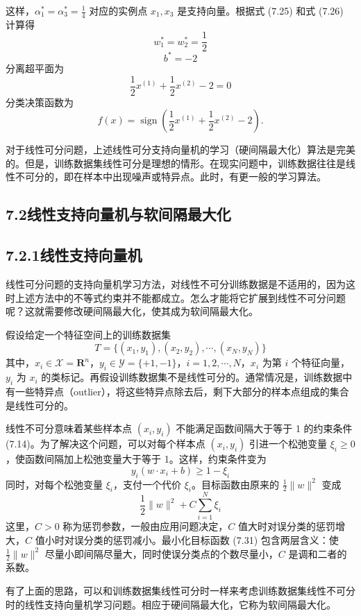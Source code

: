 \documentclass[UTF8,12pt,a4paper,fontset=fandol]{ctexart}
\begin{document}
这样，$\alpha_1^*=\alpha_3^*=\frac{1}{4}$ 对应的实例点 $x_1,x_3$ 是支持向量。根据式 (7.25) 和式 (7.26) 计算得
\[
w_1^*=w_2^*=\frac{1}{2}
\]
\[
b^*=-2
\]
分离超平面为
\[
\frac{1}{2}x^{(1)}+\frac{1}{2}x^{(2)}-2=0
\]
分类决策函数为
\[
f(x)=\operatorname{sign}\left(\frac{1}{2}x^{(1)}+\frac{1}{2}x^{(2)}-2\right).
\]

对于线性可分问题，上述线性可分支持向量机的学习（硬间隔最大化）算法是完美的。但是，训练数据集线性可分是理想的情形。在现实问题中，训练数据往往是线性不可分的，即在样本中出现噪声或特异点。此时，有更一般的学习算法。

\subsection*{7.2\quad 线性支持向量机与软间隔最大化}

\subsection*{7.2.1\quad 线性支持向量机}

线性可分问题的支持向量机学习方法，对线性不可分训练数据是不适用的，因为这时上述方法中的不等式约束并不能都成立。怎么才能将它扩展到线性不可分问题呢？这就需要修改硬间隔最大化，使其成为软间隔最大化。

假设给定一个特征空间上的训练数据集
\[
T=\{(x_1,y_1),(x_2,y_2),\cdots,(x_N,y_N)\}
\]
其中，$x_i\in\mathcal{X}=\mathbf{R}^n$，$y_i\in\mathcal{Y}=\{+1,-1\}$，$i=1,2,\cdots,N$，$x_i$ 为第 $i$ 个特征向量，$y_i$ 为 $x_i$ 的类标记。再假设训练数据集不是线性可分的。通常情况是，训练数据中有一些特异点（outlier），将这些特异点除去后，剩下大部分的样本点组成的集合是线性可分的。

线性不可分意味着某些样本点 $(x_i,y_i)$ 不能满足函数间隔大于等于 1 的约束条件 (7.14)。为了解决这个问题，可以对每个样本点 $(x_i,y_i)$ 引进一个松弛变量 $\xi_i\geq 0$，使函数间隔加上松弛变量大于等于 1。这样，约束条件变为
\[
y_i(w\cdot x_i+b)\geq 1-\xi_i
\]
同时，对每个松弛变量 $\xi_i$，支付一个代价 $\xi_i$。目标函数由原来的 $\frac{1}{2}\|w\|^2$ 变成
\begin{equation}
\frac{1}{2}\|w\|^2+C\sum_{i=1}^N\xi_i
\tag{7.31}
\end{equation}
这里，$C>0$ 称为惩罚参数，一般由应用问题决定，$C$ 值大时对误分类的惩罚增大，$C$ 值小时对误分类的惩罚减小。最小化目标函数 (7.31) 包含两层含义：使 $\frac{1}{2}\|w\|^2$ 尽量小即间隔尽量大，同时使误分类点的个数尽量小，$C$ 是调和二者的系数。

有了上面的思路，可以和训练数据集线性可分时一样来考虑训练数据集线性不可分时的线性支持向量机学习问题。相应于硬间隔最大化，它称为软间隔最大化。
\end{document}
